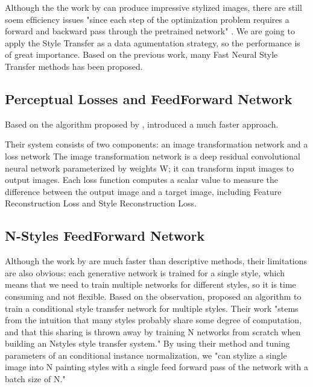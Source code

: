 \documentclass[a4paper,11pt]{article}
\begin{document}
Although the the work by \cite{gatys2016image} can produce impressive stylized images, there are still soem efﬁciency issues "since each step of the optimization problem requires a forward and backward pass through the pretrained network" \cite{johnson2016perceptual}. We are going to apply the Style Transfer as a data agumentation strategy, so the performance is of great importance. Based on the previous work, many Fast Neural Style Transfer methods has been proposed.
\subsection{Perceptual Losses and FeedForward Network}
Based on the algorithm proposed by \cite{gatys2016image}, \cite{johnson2016perceptual} introduced a much faster approach.
\begin{outline}
\1 Their system consists of two components: an image transformation network and a loss network
  \2 The image transformation network is a deep residual convolutional neural network parameterized by weights W; it can transform input images to output images.
  \2 Each loss function computes a scalar value to measure the diﬀerence between the output image and a target image, including Feature Reconstruction Loss and Style Reconstruction Loss.
\end{outline}
\subsection{N-Styles FeedForward Network}
Although the work by \cite{johnson2016perceptual} are much faster than descriptive methods, their limitations are also obvious: each generative network is trained for a single style, which means that we need to train multiple networks for different styles, so it is time consuming and not flexible. Based on the observation, \cite{dumoulin2016learned} proposed an algorithm to train a conditional style transfer network for multiple styles. Their work "stems from the intuition that many styles probably share some degree of computation, and that this sharing is thrown away by training N networks from scratch when building an Nstyles style transfer system."
By using their method and tuning parameters of an conditional instance normalization, we "can stylize a single image into N painting styles with a single feed forward pass of the network with a batch size of N." 
\end{document}
